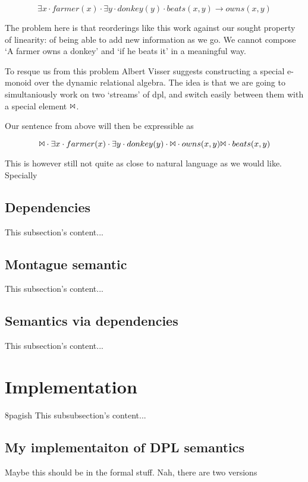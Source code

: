 \documentclass[12pt]{article}
\let\stdsection\section
\renewcommand\section{\newpage\stdsection}
\begin{document}
\begin{equation}
\exists x \cdot farmer(x) \cdot \exists y \cdot donkey(y) \cdot beats(x,y) \rightarrow owns(x,y)
\end{equation}

The problem here is that reorderings like this work against our sought property of linearity: of being able to add new information as we go. We cannot compose `A farmer owns a donkey' and `if he beats it' in a meaningful way.

To resque us from this problem Albert Visser suggests constructing a special e-monoid over the dynamic relational algebra. The idea is that we are going to simultaniously work on two `streams' of dpl, and switch easily between them with a special element $\Bowtie$.

Our sentence from above will then be expressible as

\begin{equation}
\Bowtie \cdot \exists x \cdot farmer(x) \cdot \exists y \cdot donkey(y) \cdot \Bowtie \cdot owns(x,y) \Bowtie \cdot beats(x,y)
\end{equation}

This is however still not quite as close to natural language as we would like. Specially 

\subsection{Dependencies}
This subsection's content...
\subsection{Montague semantic}
This subsection's content...
\subsection{Semantics via dependencies}
This subsection's content...

\section{Implementation}
8pagish
This subsubsection's content...

\subsection{My implementaiton of DPL semantics}
Maybe this should be in the formal stuff. Nah, there are two versions
\end{document}
